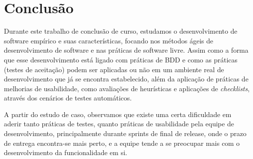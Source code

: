 \chapter{Conclusão}
\label{consideracoes-finais}

Durante este trabalho de conclusão de curso, estudamos o desenvolvimento de software empírico e suas características, focando nos métodos ágeis de desenvolvimento de software e nas práticas de software livre. Assim como a forma que esse desenvolvimento está ligado com práticas de BDD e como as práticas (testes de aceitação) podem ser aplicadas ou não em um ambiente real de desenvolvimento que já se encontra estabelecido, além da aplicação de práticas de melhorias de usabilidade, como avaliações de heurísticas e aplicações de \textit{checklists}, através dos cenários de testes automáticos.

A partir do estudo de caso, observamos que existe uma certa dificuldade em aderir tanto práticas de testes, quanto práticas de usabilidade pela equipe de desenvolvimento, principalmente durante sprints de final de release, onde o prazo de entrega encontra-se mais perto, e a equipe tende a se preocupar mais com o desenvolvimento da funcionalidade em si.
